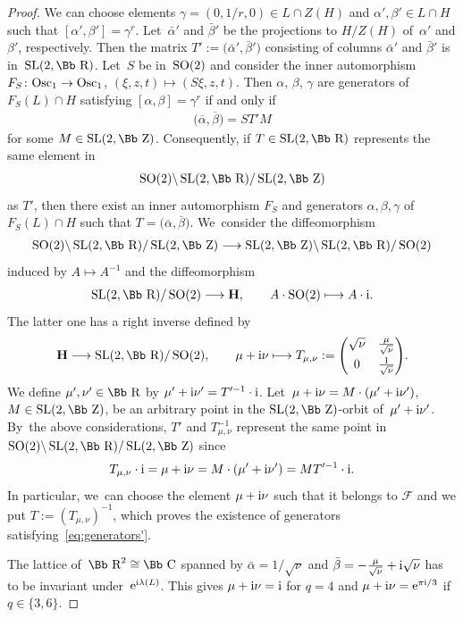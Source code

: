 \documentclass[10pt,a4paper]{amsart}
\newcommand\CC{{\mbox{\Bb C}}}
\newcommand\RR{{\mbox{\Bb R}}}
\newcommand\ZZ{{\mbox{\Bb Z}}}
\newcommand\cF{{\mathcal F}}
\newcommand{\SL}{\mathop{{\rm SL}}}
\newcommand{\SO}{\mathop{{\rm SO}}}
\newcommand{\Osc}{{\rm Osc}}
\numberwithin{equation}{section}
\begin{document}
\begin{proof}
We can choose elements $\gamma=(0,1/r,0)\in L\cap Z(H)$ and $\alpha', \beta' \in L\cap H$ such that $[\alpha',\beta']=\gamma^r$. Let~$\bar \alpha'$ and $\bar\beta'$ be the projections to $H/Z(H)$ of~$\alpha'$ and $\beta'$, respectively.
Then the matrix $T':=\big(\bar \alpha',\bar\beta'\big)$ consisting of columns $\bar \alpha'$ and $\bar \beta'$ is in~$\SL(2,\RR)$. Let~$S$ be in~$\SO(2)$ and consider the inner automorphism $F_S\colon \Osc_1 \to \Osc_1$, $(\xi,z,t)\mapsto (S\xi,z,t)$. Then $\alpha$, $\beta$, $\gamma$ are generators of~$F_S(L)\cap H$ satisfying $[\alpha,\beta]=\gamma^r$ if and only if
\begin{gather*}
\big(\overline{\alpha},\overline{\beta}\big) = ST'M
\end{gather*}
for some $M\in\SL(2,\ZZ)$. Consequently, if $T\in \SL(2,\RR)$ represents the same element in
\begin{gather*}
\SO(2)\backslash \SL(2,\RR)/\SL(2,\ZZ)
\end{gather*} as $T'$, then there exist an inner automorphism $F_S$ and generators $\alpha,\beta,\gamma$ of~$F_S(L)\cap H$ such that $T=\big(\overline{\alpha},\overline{\beta}\big)$. We~consider the diffeomorphism
\begin{gather*}
\SO(2)\backslash \SL(2,\RR)/\SL(2,\ZZ) \longrightarrow \SL(2,\ZZ)\backslash \SL(2,\RR)/\SO(2)
\end{gather*}
induced by $A\mapsto A^{-1}$ and the diffeomorphism
\begin{gather*}
\SL(2,\RR)/\SO(2) \longrightarrow \textbf{H},\qquad A\cdot \SO(2)\longmapsto A\cdot {\rm i}.
\end{gather*}
The latter one has a right inverse defined by
\begin{gather}\label{Tmunu}
\textbf{H}\longrightarrow\SL(2,\RR)/\SO(2) ,\qquad
\mu+{\rm i}\nu \longmapsto T_{\mu,\nu}:=
\begin{pmatrix}
\sqrt\nu&\frac{\mu}{\sqrt\nu}
\\[1ex]
0&\frac 1{\sqrt\nu}
\end{pmatrix}\!.
\end{gather}
We define $\mu',\nu'\in\RR$ by $\mu'+{\rm i}\nu'=T'^{-1} \cdot {\rm i}$. Let~$\mu+{\rm i}\nu=M \cdot (\mu'+{\rm i}\nu')$, $M\in\SL(2,\ZZ)$, be an arbitrary point in the $\SL(2,\ZZ)$-orbit of~$\mu'+{\rm i}\nu'$. By~the above considerations, $T'$ and $T^{-1}_{\mu,\nu}$ represent the same point in~$\SO(2)\backslash \SL(2,\RR)/\SL(2,\ZZ)$ since
\begin{gather*}
T_{\mu,\nu}\cdot {\rm i} =\mu+{\rm i}\nu=M \cdot (\mu'+{\rm i}\nu')=MT'^{-1}\cdot {\rm i}.
\end{gather*}
In particular, we~can choose the element $\mu+{\rm i}\nu$ such that it belongs to $\cF$ and we put $T:=(T_{\mu,\nu})^{-1}$, which proves the existence of generators satisfying~\eqref{eq:generators'}.

The lattice of~$\RR^2\cong \CC$ spanned by $\bar \alpha = 1/\sqrt \nu$ and $\bar\beta=-\frac{\mu}{\sqrt\nu}+{\rm i}\sqrt\nu$ has to be invariant under~${\rm e}^{{\rm i}\lambda(L)}$. This gives $\mu+{\rm i}\nu={\rm i}$ for $q=4$ and $\mu+{\rm i}\nu= {\rm e}^{\pi {\rm i}/3}$ if $q\in\{3,6\}$.
\end{proof}
\end{document}
